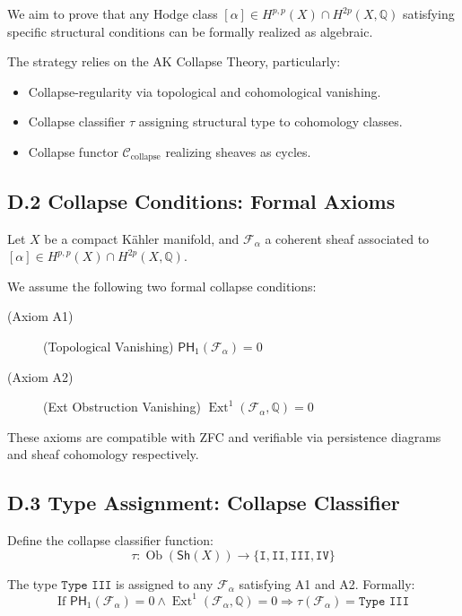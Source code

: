 \documentclass[11pt]{article}
\DeclareMathOperator{\Ext}{Ext}
\begin{document}
We aim to prove that any Hodge class $[\alpha] \in H^{p,p}(X) \cap H^{2p}(X, \mathbb{Q})$ satisfying specific structural conditions can be formally realized as algebraic.

The strategy relies on the AK Collapse Theory, particularly:

\begin{itemize}
  \item Collapse-regularity via topological and cohomological vanishing.
  \item Collapse classifier $\tau$ assigning structural type to cohomology classes.
  \item Collapse functor $\mathcal{C}_{\text{collapse}}$ realizing sheaves as cycles.
\end{itemize}

\subsection*{D.2 Collapse Conditions: Formal Axioms}

Let $X$ be a compact Kähler manifold, and $\mathcal{F}_\alpha$ a coherent sheaf associated to $[\alpha] \in H^{p,p}(X) \cap H^{2p}(X, \mathbb{Q})$.

We assume the following two formal collapse conditions:

\begin{description}
  \item[(Axiom A1)] (Topological Vanishing) $\mathsf{PH}_1(\mathcal{F}_\alpha) = 0$
  \item[(Axiom A2)] (Ext Obstruction Vanishing) $\Ext^1(\mathcal{F}_\alpha, \mathbb{Q}) = 0$
\end{description}

These axioms are compatible with ZFC and verifiable via persistence diagrams and sheaf cohomology respectively.

\subsection*{D.3 Type Assignment: Collapse Classifier}

Define the collapse classifier function:
\[
\tau : \operatorname{Ob}(\mathsf{Sh}(X)) \to \{ \texttt{I}, \texttt{II}, \texttt{III}, \texttt{IV} \}
\]

The type $\texttt{Type III}$ is assigned to any $\mathcal{F}_\alpha$ satisfying A1 and A2.  
Formally:
\[
\text{If } \mathsf{PH}_1(\mathcal{F}_\alpha) = 0 \wedge \Ext^1(\mathcal{F}_\alpha, \mathbb{Q}) = 0 \Rightarrow \tau(\mathcal{F}_\alpha) = \texttt{Type III}
\]
\end{document}

